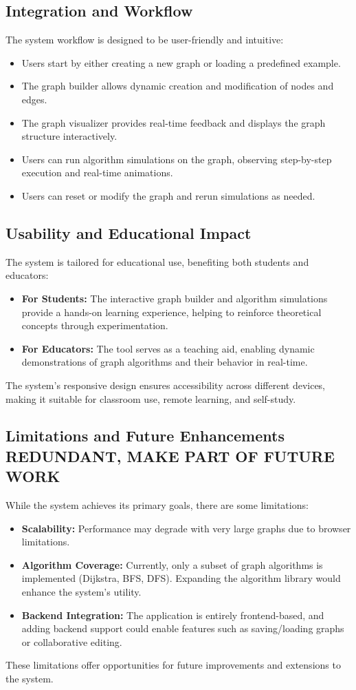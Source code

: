 \subsection{Integration and Workflow}
The system workflow is designed to be user-friendly and intuitive:
\begin{itemize}
    \item Users start by either creating a new graph or loading a predefined example.
    \item The graph builder allows dynamic creation and modification of nodes and edges.
    \item The graph visualizer provides real-time feedback and displays the graph structure interactively.
    \item Users can run algorithm simulations on the graph, observing step-by-step execution and real-time animations.
    \item Users can reset or modify the graph and rerun simulations as needed.
\end{itemize}

\subsection{Usability and Educational Impact}
The system is tailored for educational use, benefiting both students and educators:
\begin{itemize}
    \item \textbf{For Students:} The interactive graph builder and algorithm simulations provide a hands-on learning experience, helping to reinforce theoretical concepts through experimentation.
    \item \textbf{For Educators:} The tool serves as a teaching aid, enabling dynamic demonstrations of graph algorithms and their behavior in real-time.
\end{itemize}
The system’s responsive design ensures accessibility across different devices, making it suitable for classroom use, remote learning, and self-study.

\subsection{Limitations and Future Enhancements REDUNDANT, MAKE PART OF FUTURE WORK}
While the system achieves its primary goals, there are some limitations:
\begin{itemize}
    \item \textbf{Scalability:} Performance may degrade with very large graphs due to browser limitations.
    \item \textbf{Algorithm Coverage:} Currently, only a subset of graph algorithms is implemented (Dijkstra, BFS, DFS). Expanding the algorithm library would enhance the system’s utility.
    \item \textbf{Backend Integration:} The application is entirely frontend-based, and adding backend support could enable features such as saving/loading graphs or collaborative editing.
\end{itemize}
These limitations offer opportunities for future improvements and extensions to the system.

